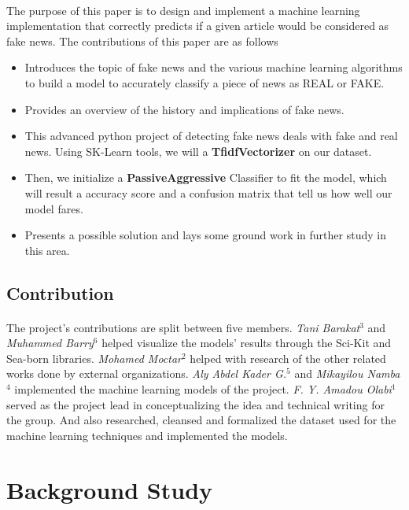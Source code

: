 \documentclass[11.5pt]{article}
\begin{document}
\begin{multicols}{2}
\paragraph{}
The purpose of this paper is to design and implement a machine learning implementation that correctly predicts if a given article would be considered as fake news. The contributions of this paper are as follows
\begin{itemize}
    \item Introduces the topic of fake news and the various machine learning algorithms to build a model to accurately classify a piece of news as REAL or FAKE.
    \item Provides an overview of the history and implications of fake news.
    \item This advanced python project of detecting fake news deals with fake and real news. Using SK-Learn tools, we will a \textbf{TfidfVectorizer} on our dataset.
    \item Then, we initialize a \textbf{PassiveAggressive} Classifier to fit the model, which will result a accuracy score and a confusion matrix that tell us how well our model fares.
    \item Presents a possible solution and lays some ground work in further study in this area.
\end{itemize}

\subsection{Contribution}
\paragraph{}
The project’s contributions are split between five members. 
\textit{Tani Barakat}$^3$ and \textit{Muhammed Barry}$^6$ helped visualize the models’ results through the Sci-Kit and Sea-born libraries. 
\textit{Mohamed Moctar}$^2$ helped with research of the other related works done by external organizations. 
\textit{Aly Abdel Kader G.}$^5$ and \textit{Mikayilou Namba}$^4$ implemented the machine learning models of the project.
\textit{F. Y. Amadou Olabi}$^1$ served as the project lead in conceptualizing the idea and technical writing for the group. And also researched, cleansed and formalized the dataset used for the machine learning techniques and implemented the models. 

\section{Background Study}

\end{multicols}
\end{document}
